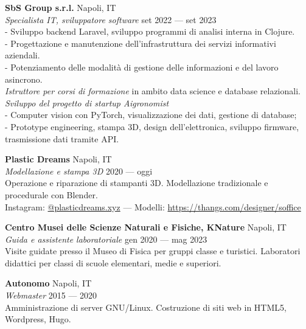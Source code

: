 \documentclass[a4paper]{article}
\begin{document}
\vspace{5mm}

\textbf{SbS Group s.r.l.} \hfill Napoli, IT \\
\textit{Specialista IT, sviluppatore software}  \hfill set 2022 --- set 2023 \\
 - Sviluppo backend Laravel, sviluppo programmi di analisi interna in Clojure. \\
 - Progettazione e manutenzione dell'infrastruttura dei servizi informativi aziendali. \\
 - Potenziamento delle modalità di gestione delle informazioni e del lavoro asincrono. \\
\textit{Istruttore per corsi di formazione} in ambito data science e database relazionali. \\
\textit{Sviluppo del progetto di startup Aigronomist} \\
 - Computer vision con PyTorch, visualizzazione dei dati, gestione di database; \\
 - Prototype engineering, stampa 3D, design dell'elettronica, sviluppo firmware, trasmissione dati tramite API.
\vspace{5mm}

\textbf{Plastic Dreams} \hfill Napoli, IT \\
\textit{Modellazione e stampa 3D} \hfill 2020 --- oggi \\
Operazione e riparazione di stampanti 3D. Modellazione tradizionale e procedurale con Blender. \\
Instagram: \href{https://www.instagram.com/plasticdreams.xyz/}{@plasticdreams.xyz}
--- Modelli: \url{https://thangs.com/designer/soffice}
\vspace{5mm}

\textbf{Centro Musei delle Scienze Naturali e Fisiche, KNature} \hfill Napoli, IT \\
\textit{Guida e assistente laboratoriale} \hfill gen 2020 --- mag 2023 \\
Visite guidate presso il Museo di Fisica per gruppi classe e turistici.
Laboratori didattici per classi di scuole elementari, medie e superiori.
\vspace{5mm}

\textbf{Autonomo} \hfill Napoli, IT \\
\textit{Webmaster}
\hfill 2015 --- 2020\\
Amministrazione di server GNU/Linux.
Costruzione di siti web in HTML5, Wordpress, Hugo. \\
\vspace{2mm}
\end{document}
